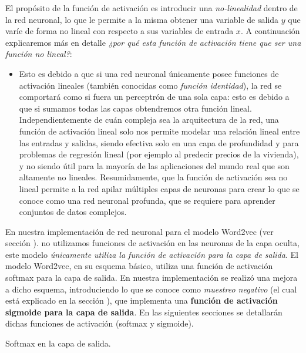 \documentclass[12pt,a4paper]{article}
\makeatletter
\renewcommand\paragraph{\@startsection{paragraph}{4}{\z@}
            {-2.5ex\@plus -1ex \@minus -.25ex}
            {1.25ex \@plus .25ex}
            {\normalfont\normalsize\bfseries}}
\makeatother
\begin{document}
\begin{sloppypar}
El propósito de la función de activación es introducir una \textit{no-linealidad} dentro de la red neuronal, lo que le permite a la misma obtener una variable de salida $y$ que varíe de forma no lineal con respecto a sus variables de entrada $x$. A continuación explicaremos más en detalle \textit{¿por qué esta función de activación tiene que ser una función no lineal?}:
\begin{itemize}
\item Esto es debido a que si una red neuronal únicamente posee funciones de activación lineales (también conocidas como \textit{función identidad}), la red se comportará como si fuera un perceptrón de una sola capa: esto es debido a que si sumamos todas las capas obtendremos otra función lineal.
Independientemente de cuán compleja sea la arquitectura de la red, una función de activación lineal solo nos permite modelar una relación lineal entre las entradas y salidas, siendo efectiva solo en una capa de profundidad y para problemas de regresión lineal (por ejemplo al predecir precios de la vivienda), y no siendo útil para la mayoría de las aplicaciones del mundo real que son altamente no lineales.
Resumidamente, que la función de activación sea no lineal permite a la red apilar múltiples capas de neuronas para crear lo que se conoce como una red neuronal profunda, que se requiere para aprender conjuntos de datos complejos.
\end{itemize}

En nuestra implementación de red neuronal para el modelo Word2vec (ver sección \textit{}). no utilizamos funciones de activación en las neuronas de la capa oculta, este modelo \textit{únicamente utiliza la función de activación para la capa de salida}. 
El modelo Word2vec, en su esquema básico, utiliza una función de activación softmax para la capa de salida. En nuestra implementación se realizó una mejora a dicho esquema, introduciendo lo que se conoce como \textit{muestreo negativo} (el cual está explicado en la sección \textit{}), que implementa una \textbf{función de activación sigmoide para la capa de salida}. En las siguientes secciones se detallarán dichas funciones de activación (softmax y sigmoide).

\paragraph{Softmax en la capa de salida.}\label{soft_capa_salida}


\end{sloppypar}
\end{document}
